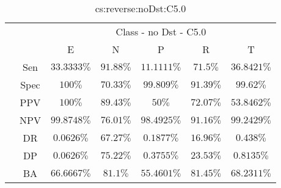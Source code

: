 \begin{table}[!ht]
	\centering
	\begin{tabular}{|c|c|c|c|c|c|c|}
		\cline{3-7}
		\multicolumn{2}{c|}{} & \multicolumn{5}{c|}{Class - no Dst - C5.0} \\ \cline{3-7}
		\multicolumn{2}{c|}{} & E & N & P & R & T \\ \hline
		\multirow{7}{*}{\rotatebox{90}{Statistics}} & Sen & $33.3333\%$ & $91.88\%$ & $11.1111\%$ & $71.5\%$ & $36.8421\%$ \\ \cline{2-7}
		 & Spec & $100\%$ & $70.33\%$ & $99.809\%$ & $91.39\%$ & $99.62\%$ \\ \cline{2-7}
		 & PPV & $100\%$ & $89.43\%$ & $50\%$ & $72.07\%$ & $53.8462\%$ \\ \cline{2-7}
		 & NPV & $99.8748\%$ & $76.01\%$ & $98.4925\%$ & $91.16\%$ & $99.2429\%$ \\ \cline{2-7}
		 & DR & $0.0626\%$ & $67.27\%$ & $0.1877\%$ & $16.96\%$ & $0.438\%$ \\ \cline{2-7}
		 & DP & $0.0626\%$ & $75.22\%$ & $0.3755\%$ & $23.53\%$ & $0.8135\%$ \\ \cline{2-7}
		 & BA & $66.6667\%$ & $81.1\%$ & $55.4601\%$ & $81.45\%$ & $68.2311\%$ \\ \hline
	\end{tabular}
	\caption{cs:reverse:noDst:C5.0}
	\label{tab:cs:reverse:noDst:C5.0}
\end{table}
